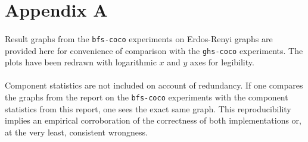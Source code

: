 \documentclass[11pt,epsf]{article}
\begin{document}
\printbibliography

\section{Appendix A}{
  \paragraph{}{
    Result graphs from the \texttt{bfs-coco} experiments on Erdos-Renyi graphs are provided
    here for convenience of comparison with the \texttt{ghs-coco} experiments. The plots
    have been redrawn with logarithmic $x$ and $y$ axes for legibility.
  }
  \paragraph{}{
    Component statistics are not included on account of redundancy. If one compares the graphs from
    the report on the \texttt{bfs-coco} experiments with the component statistics from this report,
    one sees the exact same graph. This reproducibility implies an empirical corroboration of the
    correctness of both implementations or, at the very least, consistent wrongness.
  }

}
\end{document}
